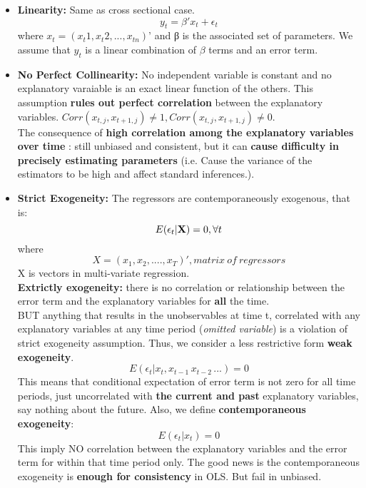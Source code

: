 \documentclass[12pt]{article}
\begin{document}
\begin{itemize}
\item \textbf{Linearity:} Same as cross sectional case.
\begin{equation}
y_t =\beta′x_t +\epsilon_t
\end{equation}
where $x_t = (x_t1,x_t2,...,x_{tn})’$ and β is the associated set of parameters. We assume that $y_t$ is a linear combination of $\beta$ terms and an error term.

\item \textbf{No Perfect Collinearity:}
No independent variable is constant and no explanatory varaiable is an exact linear function of the others. This assumption \textbf{rules out perfect correlation} between the explanatory variables. $Corr(x_{t,j}, x_{t+1,j}) \ne 1, Corr(x_{t,j}, x_{t+1,j}) \ne 0 $. 
\\
The consequence of \textbf{high correlation among the explanatory variables over time} : still unbiased and consistent, but it can \textbf{cause difficulty in precisely estimating parameters} (i.e. Cause the variance of the estimators to be high and affect standard inferences.).

\item \textbf{Strict Exogeneity:}
The regressors are contemporaneously exogenous, that is:
\begin{equation}
E(\epsilon_t | \textbf{X}) = 0, \forall t  \\
\end{equation}
where
$$ X=(x_1, x_2, .... , x_T)', matrix \ of \ regressors $$ 
X is vectors in multi-variate regression. 
\\

\noindent
\textbf{Extrictly exogeneity: } there is no correlation or relationship between the error term and the explanatory variables for \textbf{all} the time.
\\

BUT anything that results in the unobservables at time t, correlated with any explanatory variables at any time period (\textit{omitted variable}) is a violation of strict exogeneity assumption. Thus, we consider a less restrictive form \textbf{weak exogeneity}.
\begin{equation}
E(\epsilon_t|x_t, x_{t-1}\, x_{t-2}\, ...) = 0
\end{equation}
 This means that conditional expectation of error term is not zero for all time periods, just uncorrelated with \textbf{the current and past} explanatory variables, say nothing about the future.
Also, we define \textbf{contemporaneous exogeneity}:
 \begin{equation}
E(\epsilon_t|x_t) = 0
\end{equation}
This imply NO correlation between the explanatory variables and the error term for within that time period only. The good news is the contemporaneous exogeneity is \textbf{enough for consistency} in OLS. But fail in unbiased.
\end{itemize}
\end{document}
